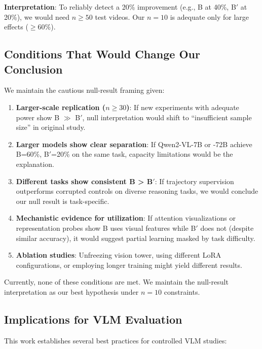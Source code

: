 \textbf{Interpretation}: To reliably detect a 20\% improvement (e.g., B at 40\%, B$'$ at 20\%), we would need $n \geq 50$ test videos. Our $n=10$ is adequate only for large effects ($\geq 60\%$).

\subsection{Conditions That Would Change Our Conclusion}

We maintain the cautious null-result framing given:

\begin{enumerate}
    \item \textbf{Larger-scale replication ($n \geq 30$)}: If new experiments with adequate power show B $\gg$ B$'$, null interpretation would shift to ``insufficient sample size'' in original study.
    
    \item \textbf{Larger models show clear separation}: If Qwen2-VL-7B or -72B achieve B=60\%, B$'$=20\% on the same task, capacity limitations would be the explanation.
    
    \item \textbf{Different tasks show consistent B > B$'$}: If trajectory supervision outperforms corrupted controls on diverse reasoning tasks, we would conclude our null result is task-specific.
    
    \item \textbf{Mechanistic evidence for utilization}: If attention visualizations or representation probes show B uses visual features while B$'$ does not (despite similar accuracy), it would suggest partial learning masked by task difficulty.
    
    \item \textbf{Ablation studies}: Unfreezing vision tower, using different LoRA configurations, or employing longer training might yield different results.
\end{enumerate}

Currently, none of these conditions are met. We maintain the null-result interpretation as our best hypothesis under $n=10$ constraints.

\subsection{Implications for VLM Evaluation}

This work establishes several best practices for controlled VLM studies:

